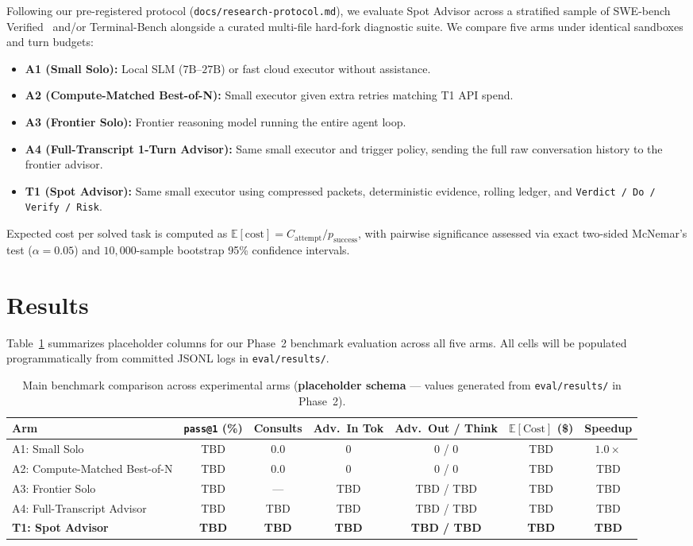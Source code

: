 \documentclass[11pt]{article}
\begin{document}
Following our pre-registered protocol (\texttt{docs/research-protocol.md}), we evaluate Spot Advisor across a stratified sample of SWE-bench Verified~\citep{jimenez2024swebench} and/or Terminal-Bench alongside a curated multi-file hard-fork diagnostic suite. We compare five arms under identical sandboxes and turn budgets:
\begin{itemize}
    \item \textbf{A1 (Small Solo):} Local SLM ($7\text{B}\text{--}27\text{B}$) or fast cloud executor without assistance.
    \item \textbf{A2 (Compute-Matched Best-of-N):} Small executor given extra retries matching T1 API spend.
    \item \textbf{A3 (Frontier Solo):} Frontier reasoning model running the entire agent loop.
    \item \textbf{A4 (Full-Transcript 1-Turn Advisor):} Same small executor and trigger policy, sending the full raw conversation history to the frontier advisor.
    \item \textbf{T1 (Spot Advisor):} Same small executor using compressed packets, deterministic evidence, rolling ledger, and \texttt{Verdict / Do / Verify / Risk}.
\end{itemize}
Expected cost per solved task is computed as $\mathbb{E}[\text{cost}] = C_{\text{attempt}} / p_{\text{success}}$, with pairwise significance assessed via exact two-sided McNemar's test ($\alpha = 0.05$) and $10{,}000$-sample bootstrap 95\% confidence intervals.

\section{Results}
\label{sec:results}

Table~\ref{tab:main-results} summarizes placeholder columns for our Phase~2 benchmark evaluation across all five arms. All cells will be populated programmatically from committed JSONL logs in \texttt{eval/results/}.

\begin{table}[t]
\centering
\caption{Main benchmark comparison across experimental arms (\textbf{placeholder schema} --- values generated from \texttt{eval/results/} in Phase~2).}
\label{tab:main-results}
\begin{tabular}{@{}lcccccc@{}}
\toprule
Arm & \texttt{pass@1} (\%) & Consults & Adv.\ In Tok & Adv.\ Out / Think & $\mathbb{E}[\text{Cost}]$ (\$) & Speedup \\
\midrule
A1: Small Solo                  & TBD & 0.0 & 0   & 0 / 0     & TBD & $1.0\times$ \\
A2: Compute-Matched Best-of-N   & TBD & 0.0 & 0   & 0 / 0     & TBD & TBD \\
A3: Frontier Solo               & TBD & --- & TBD & TBD / TBD & TBD & TBD \\
A4: Full-Transcript Advisor     & TBD & TBD & TBD & TBD / TBD & TBD & TBD \\
\textbf{T1: Spot Advisor}       & \textbf{TBD} & \textbf{TBD} & \textbf{TBD} & \textbf{TBD / TBD} & \textbf{TBD} & \textbf{TBD} \\
\bottomrule
\end{tabular}
\end{table}
\end{document}
